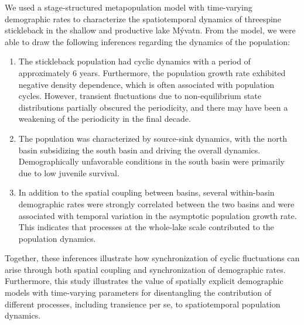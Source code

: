 \documentclass[11pt]{article}
\begin{document}
{We used a stage-structured metapopulation model 
with time-varying demographic rates to characterize the 
spatiotemporal dynamics of threespine stickleback 
in the shallow and productive lake M\'{y}vatn.
From the model, we were able to draw the following inferences regarding the 
dynamics of the population:
%
\begin{enumerate}[label=(\alph*)]
\item
The stickleback population had cyclic dynamics with a period of approximately 6 years.
Furthermore, the population growth rate exhibited negative density dependence,
which is often associated with population cycles.
However, transient fluctuations due to non-equilibrium state distributions
partially obscured the periodicity,
and there may have been a weakening of the periodicity in the final decade.
%
\item
The population was characterized by source-sink dynamics, 
with the north basin subsidizing the south basin and driving the overall dynamics. 
Demographically unfavorable conditions in the south basin were 
primarily due to low juvenile survival.
%
\item
In addition to the spatial coupling between basins,
several within-basin demographic rates were strongly correlated 
between the two basins and 
were associated with temporal variation in the asymptotic population growth rate.
This indicates that processes at the whole-lake scale contributed 
to the population dynamics.
\end{enumerate}
%
Together, these inferences illustrate how synchronization of cyclic fluctuations 
can arise through both spatial coupling and synchronization of demographic rates.
Furthermore, this study illustrates the value of spatially explicit demographic models 
with time-varying parameters for disentangling the contribution of different processes,
including transience per se, to spatiotemporal population dynamics.

}
\end{document}
